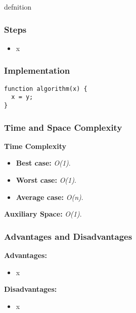 defnition

\subsubsection{Steps}

\begin{itemize}
  \item x
\end{itemize}

\subsubsection{Implementation}

\begin{lstlisting}[style=general]
function algorithm(x) {
  x = y;
}
\end{lstlisting}

\subsubsection{Time and Space Complexity}

\textbf{Time Complexity}

\begin{itemize}
  \item \textbf{Best case:} \textit{O(1)}.
  \item \textbf{Worst case:} \textit{O(1)}.
  \item \textbf{Average case:} \emph{O(n)}.
\end{itemize}

\textbf{Auxiliary Space:} \textit{O(1)}.

\subsubsection{Advantages and Disadvantages}

\textbf{Advantages:}

\begin{itemize}
  \item x
\end{itemize}

\textbf{Disadvantages:}

\begin{itemize}
  \item x
\end{itemize}
